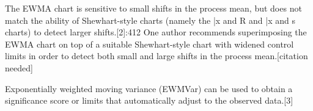 The EWMA chart is sensitive to small shifts in the process mean, but does not match the ability of Shewhart-style charts (namely the {} {\bar {x}} and R and {} {\bar {x}} and s charts) to detect larger shifts.[2]:412 One author recommends superimposing the EWMA chart on top of a suitable Shewhart-style chart with widened control limits in order to detect both small and large shifts in the process mean.[citation needed]

Exponentially weighted moving variance (EWMVar) can be used to obtain a significance score or limits that automatically adjust to the observed data.[3]
